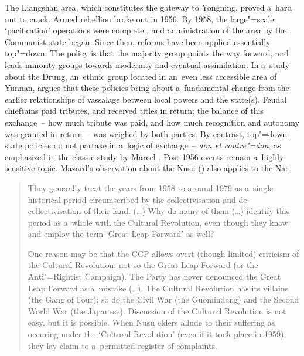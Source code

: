 \begin{sloppypar}
The Liangshan   area, which constitutes the gateway to Yongning, proved a~hard nut to crack. Armed rebellion broke out in 1956. By 1958, the large"=scale ‘pacification’ operations were complete \citep[228-231]{guoState2008}, and administration of the area by the Communist state began. Since then, reforms have been applied essentially top"=down. The policy is that the majority group points the way forward, and leads minority groups towards modernity and eventual {assimilation}. In a~study about the Drung, an~ethnic
group located in an~even less accessible area of Yunnan, \citet{gros2014} argues that these policies bring about a~fundamental change from the earlier relationships of
vassalage between local powers and the state(s). Feudal chieftains paid tributes, and received titles in
return; the balance of this exchange~-- how much tribute was paid, and how much recognition and
autonomy was granted in return~-- was weighed by both parties. By contrast, top"=down state policies
do not partake in a~logic of exchange~-- \textit{don et contre"=don}, as emphasized in the classic
study by Marcel \citet{mauss1990}. Post-1956 events remain a~highly sensitive topic. Mazard's observation about the Nusu () also applies to the Na:
\end{sloppypar}

\begin{quotation}
	They generally
	treat the years from 1958 to around 1979 as a~single historical period circumscribed
	by the collectivisation and de-collectivisation of their land. ({\dots}) Why do many of them ({\dots}) identify this period as a~whole with the
	Cultural Revolution, even though they know and employ the term ‘Great Leap
	Forward’ as well?
	
	One reason may be that the CCP allows overt (though
	limited) criticism of the Cultural Revolution; not so the Great Leap Forward (or the Anti"=Rightist
	Campaign). The Party has never denounced the Great Leap Forward as a~{mistake} ({\dots}). The
	Cultural Revolution has its villains (the Gang of Four); so do the Civil War (the Guomindang) and
	the Second World War (the {Japanese}). Discussion of the Cultural Revolution is not easy, but it is
	possible. When Nusu elders allude to their suffering as occuring under the ‘Cultural Revolution’
	(even if it took place in 1959), they lay claim to a~permitted register of complaints. \citep[172]{mazard2011}
\end{quotation}

